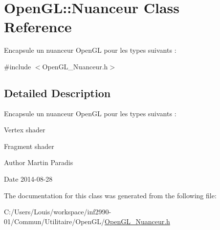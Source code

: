 \hypertarget{class_open_g_l_1_1_nuanceur}{}\section{Open\+G\+L\+:\+:Nuanceur Class Reference}
\label{class_open_g_l_1_1_nuanceur}


Encapsule un nuanceur Open\+G\+L pour les types suivants \+:  




{\ttfamily \#include $<$Open\+G\+L\+\_\+\+Nuanceur.\+h$>$}



\subsection{Detailed Description}
Encapsule un nuanceur Open\+G\+L pour les types suivants \+: 


\begin{DoxyItemize}
\item Vertex shader
\item Fragment shader
\end{DoxyItemize}

\begin{DoxyAuthor}{Author}
Martin Paradis 
\end{DoxyAuthor}
\begin{DoxyDate}{Date}
2014-\/08-\/28 
\end{DoxyDate}


The documentation for this class was generated from the following file\+:\begin{DoxyCompactItemize}
\item 
C\+:/\+Users/\+Louis/workspace/inf2990-\/01/\+Commun/\+Utilitaire/\+Open\+G\+L/\hyperlink{_open_g_l___nuanceur_8h}{Open\+G\+L\+\_\+\+Nuanceur.\+h}\end{DoxyCompactItemize}
